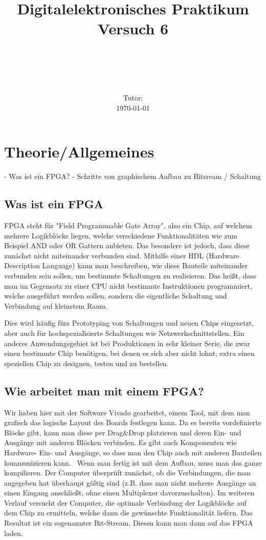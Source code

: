 \documentclass[11pt, a4paper]{article}
\title{\textbf{Digitalelektronisches Praktikum\\ Versuch 6}}
\author{\ATutantName \\ \emph{\ATutantEmail} \and \BTutantName\\ \emph{\BTutantEmail}}
\date{\Gruppennummer \\[3ex] Tutor: \Tutorname \\[3ex] \today}
\begin{document}
\clearpage
\maketitle
\thispagestyle{empty}
\newpage

\section*{Theorie/Allgemeines}
- Was ist ein FPGA?
- Schritte von graphischem Aufbau zu Bitsream / Schaltung

\subsection*{Was ist ein FPGA}
FPGA steht für "Field Programmable Gate Array", also ein Chip, auf welchem mehrere Logikblöcke liegen, welche verschiedene Funktionalitäten wie zum Beispiel AND oder OR Gattern anbieten. Das besondere ist jedoch, dass diese zunächst nicht miteinander verbunden sind. Mithilfe einer HDL (Hardware Description Language) kann man beschreiben, wie diese Bauteile miteinander verbunden sein sollen, um bestimmte Schaltungen zu realisieren. Das heißt, dass man im Gegensatz zu einer CPU nicht bestimmte Instruktionen programmiert, welche ausgeführt werden sollen, sondern die eigentliche Schaltung und Verbindung auf kleinstem Raum.

Dies wird häufig fürs Prototyping von Schaltungen und neuen Chips eingesetzt, aber auch für hochspezialisierte Schaltungen wie Netzwerkschnittstellen. Ein anderes Anwendungsgebiet ist bei Produktionen in sehr kleiner Serie, die zwar einen bestimmte Chip benötigen, bei denen es sich aber nicht lohnt, extra einen speziellen Chip zu designen, testen und zu bestellen.

\subsection*{Wie arbeitet man mit einem FPGA?}
Wir haben hier mit der Software Vivado gearbeitet, einem Tool, mit dem man grafisch das logische Layout des Boards festlegen kann. Da es bereits vordefinierte Blöcke gibt, kann man diese per Drag\&Drop platzieren und deren Ein- und Ausgänge mit anderen Blöcken verbinden. Es gibt auch Komponenten wie Hardware- Ein- und Ausgänge, so dass man den Chip auch mit anderen Bauteilen kommunizieren kann.
\
Wenn man fertig ist mit dem Aufbau, muss man das ganze kompilieren. Der Computer überprüft zunächst, ob die Verbindungen, die man angegeben hat überhaupt gültig sind (z.B. dass man nicht mehrere Ausgänge an einen Eingang anschließt, ohne einen Multiplexer davorzuschalten). Im weiteren Verlauf versucht der Computer, die optimale Verbindung der Logikblöcke auf dem Chip zu ermitteln, welche dann die gewünschte Funktionalität liefern. Das Resultat ist ein sogenannter Bit-Stream. Diesen kann man dann auf das FPGA laden.
\end{document}
